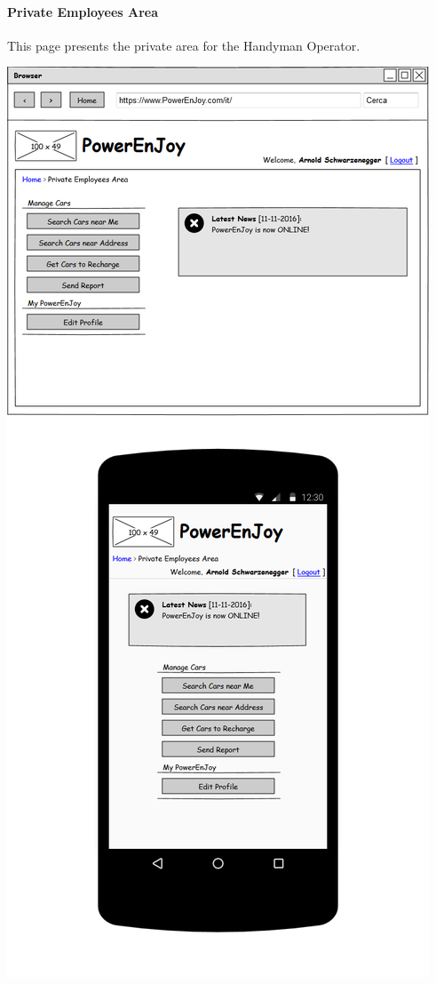 \documentclass{article}
\begin{document}
			\paragraph{Private Employees Area} This page presents the private area for the Handyman Operator.
			\begin{center}
				\includegraphics[width=0.6\linewidth]{"img/ui/private-area-employee"}
			\end{center}
			\pagebreak
			
\end{document}

